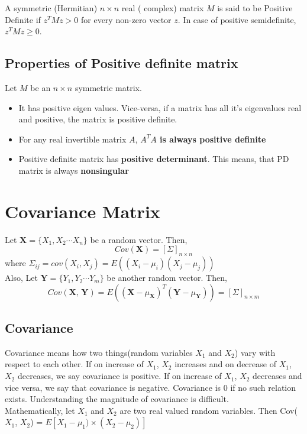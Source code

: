 \documentclass[12pt]{article}
\begin{document}
		A symmetric (Hermitian) $n \times n$ real ( complex) matrix $M$ is said to be Positive Definite if $z^TMz > 0$ for every non-zero vector $z$. In case of positive semidefinite, $z^TMz \ge 0$. 
		
		\subsection{Properties of Positive definite matrix}
			Let $M$ be an $n \times n$ symmetric matrix.
			\begin{itemize}
				\item It has positive eigen values. Vice-versa, if a matrix has all it's eigenvalues real and positive, the matrix is positive definite. 
				\item For any real invertible matrix $A$, \textbf{$A^{T}A$ is always positive definite}
				\item Positive definite matrix has \textbf{positive determinant}. This means, that PD matrix is always \textbf{nonsingular}
			\end{itemize}
	\section{Covariance Matrix}
	
		Let $\textbf{X} = \{X_1, X_2 \cdots X_n\}$ be a random vector. Then, 
		\begin{equation}
		Cov(\textbf{X}) = [\Sigma]_{n \times n} 
		\end{equation}
		where $\Sigma_{ij} = cov(X_i, X_j) = E((X_i - \mu_i)(X_j - \mu_j))$
		\\
		Also, Let $\textbf{Y} = \{Y_1, Y_2 \cdots Y_m\}$ be another random vector. Then, 
		\begin{equation}
			Cov(\textbf{X, Y}) = E({(\textbf{X} - \mu_\textbf{X})}^T(\textbf{Y} - \mu_\textbf{Y})) = [\Sigma]_{n \times m}
		\end{equation}
	
		\subsection{Covariance}
			Covariance means how two things(random variables $X_1$ and $X_2$) vary with respect to each other. If on increase of $X_1$, $X_2$ increases and on decrease of $X_1$, $X_2$ decreases, we say covariance is positive. If on increase of $X_1$, $X_2$ decreases and vice versa, we say that covariance is negative. Covariance is 0 if no such relation exists. Understanding the magnitude of covariance is difficult. 
			\\
			Mathematically, let $X_1$ and $X_2$ are two real valued random variables. Then Cov($X_1$, $X_2$) = $E[X_1 - \mu_1)\times(X_2-\mu_2)]$
		
\end{document}

